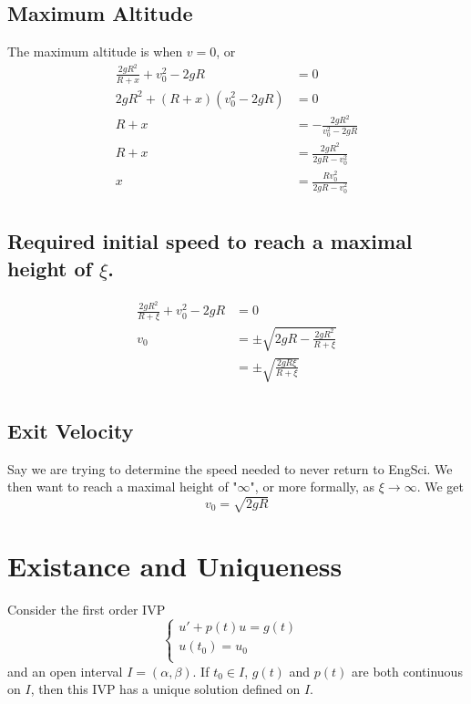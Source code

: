 \documentclass[12pt]{article}
\begin{document}
\subsection{Maximum Altitude}
The maximum altitude is when $v = 0$, or
\begin{align*}
	\frac{2gR^2}{R+x} + v_0^2 - 2gR &= 0 \\
	2gR^2 + (R+x)(v_0^2-2gR) &= 0 \\
	R+x &= -\frac{2gR^2}{v_0^2-2gR} \\
	R+x &= \frac{2gR^2}{2gR-v_0^2} \\
	x &= \frac{Rv_0^2}{2gR-v_0^2} \\
\end{align*}

\subsection{Required initial speed to reach a maximal height of $\xi$.}
\begin{align*}
	\frac{2gR^2}{R+\xi} + v_0^2 - 2gR &= 0 \\
	v_0 &= \pm \sqrt{2gR - \frac{2gR^2}{R+\xi}} \\
	    &= \pm \sqrt{\frac{2gR\xi}{R+\xi}} \\
\end{align*}

\subsection{Exit Velocity}
Say we are trying to determine the speed needed to never return to EngSci. We then want to reach a maximal height of "$\infty$", or more formally, as $\xi \rightarrow \infty$. We get
$$v_0 = \sqrt{2gR}$$

\section{Existance and Uniqueness}

\begin{thm}
	Consider the first order IVP
	$$\begin{cases} u'+p(t)u = g(t) & \\ u(t_0) = u_0 & \\ \end{cases}$$
	and an open interval $I = (\alpha, \beta)$. If $t_0 \in I$, $g(t)$ and $p(t)$ are both continuous on $I$, then this IVP has a unique solution defined on $I$.
\end{thm}
\end{document}
